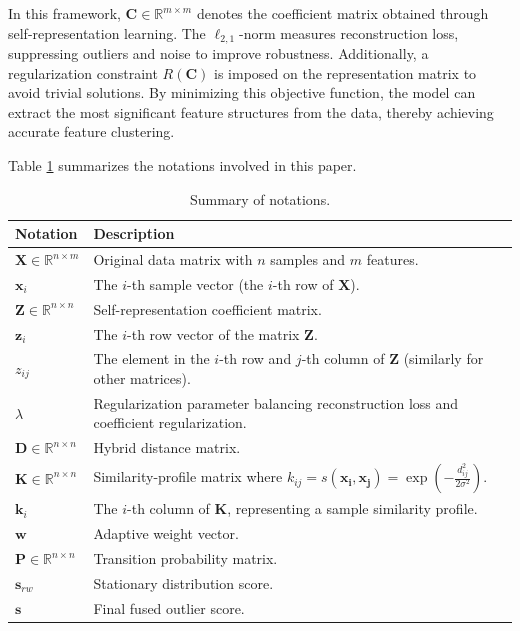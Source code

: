 \documentclass[ASNA,twocolumn]{USG} %
\begin{document}
In this framework, $\boldsymbol{C} \in \mathbb{R}^{m \times m}$ denotes the coefficient matrix obtained through self-representation learning. The $\ell_{2,1}$-norm measures reconstruction loss, suppressing outliers and noise to improve robustness. Additionally, a regularization constraint $R(\boldsymbol{C})$ is imposed on the representation matrix to avoid trivial solutions. By minimizing this objective function, the model can extract the most significant feature structures from the data, thereby achieving accurate feature clustering.

Table \ref{tab:notations} summarizes the notations involved in this paper.

\begin{table}[!ht]
\caption{Summary of notations.}\label{tab:notations}
\centering
    \begin{tabular}{ll} 
    \toprule
    \textbf{Notation} & \textbf{Description} \\
    \midrule
    $\boldsymbol{X} \in \mathbb{R}^{n \times m}$ & Original data matrix with $n$ samples and $m$ features. \\
    $\boldsymbol{x}_i$ & The $i$-th sample vector (the $i$-th row of $\boldsymbol{X}$). \\
    $\boldsymbol{Z} \in \mathbb{R}^{n \times n}$ & Self-representation coefficient matrix. \\
    $\boldsymbol{z}_i$ & The $i$-th row vector of the matrix $\boldsymbol{Z}$. \\
    $z_{ij}$ & The element in the $i$-th row and $j$-th column of $\boldsymbol{Z}$ (similarly for other matrices). \\
    $\lambda$ & Regularization parameter balancing reconstruction loss and coefficient regularization. \\
    $\boldsymbol{D} \in \mathbb{R}^{n \times n}$ & Hybrid distance matrix. \\
    $\boldsymbol{K} \in \mathbb{R}^{n \times n}$ & Similarity-profile matrix where $k_{ij} = s\left(\boldsymbol{x_i}, \boldsymbol{x_j}\right)=\exp \left(-\frac{d_{i j}^2}{2 \sigma^2}\right)$. \\
    $\boldsymbol{k}_i$ & The $i$-th column of $\boldsymbol K$, representing a sample similarity profile. \\
    $\boldsymbol{w}$ & Adaptive weight vector. \\
    $\boldsymbol{P} \in \mathbb{R}^{n \times n}$ & Transition probability matrix. \\
    $\boldsymbol{s}_{rw}$ & Stationary distribution score. \\
    $\boldsymbol{s}$ & Final fused outlier score. \\
    \bottomrule
    \end{tabular}
\end{table}
\end{document}
